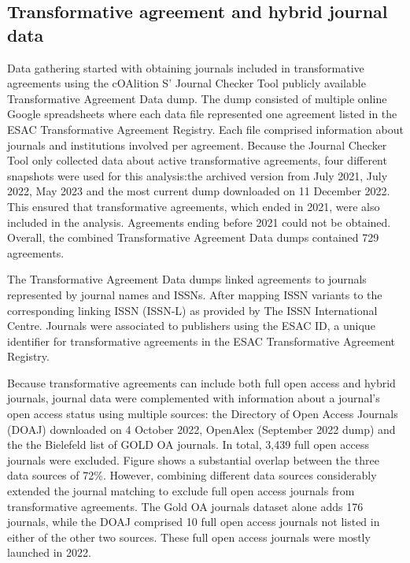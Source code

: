 \documentclass[a4paper,man,floatsintext,longtable,noextraspace,12pt]{apa6}
\begin{document}
\hypertarget{transformative-agreement-and-hybrid-journal-data}{%
\subsection{Transformative agreement and hybrid journal
data}\label{transformative-agreement-and-hybrid-journal-data}}

Data gathering started with obtaining journals included in
transformative agreements using the cOAlition S' Journal Checker Tool
publicly available Transformative Agreement Data dump. The dump
consisted of multiple online Google spreadsheets where each data file
represented one agreement listed in the ESAC Transformative Agreement
Registry. Each file comprised information about journals and
institutions involved per agreement. Because the Journal Checker Tool
only collected data about active transformative agreements, four
different snapshots were used for this analysis:the archived version
from July 2021, July 2022, May 2023 and the most current dump downloaded
on 11 December 2022. This ensured that transformative agreements, which
ended in 2021, were also included in the analysis. Agreements ending
before 2021 could not be obtained. Overall, the combined Transformative
Agreement Data dumps contained 729 agreements.

The Transformative Agreement Data dumps linked agreements to journals
represented by journal names and ISSNs. After mapping ISSN variants to
the corresponding linking ISSN (ISSN-L) as provided by The ISSN
International Centre. Journals were associated to publishers using the
ESAC ID, a unique identifier for transformative agreements in the ESAC
Transformative Agreement Registry.

Because transformative agreements can include both full open access and
hybrid journals, journal data were complemented with information about a
journal's open access status using multiple sources: the Directory of
Open Access Journals (DOAJ) downloaded on 4 October 2022, OpenAlex
(September 2022 dump) and the the Bielefeld list of GOLD OA journals. In
total, 3,439 full open access journals were excluded. Figure shows a
substantial overlap between the three data sources of 72\%. However,
combining different data sources considerably extended the journal
matching to exclude full open access journals from transformative
agreements. The Gold OA journals dataset alone adds 176 journals, while
the DOAJ comprised 10 full open access journals not listed in either of
the other two sources. These full open access journals were mostly
launched in 2022.
\end{document}
